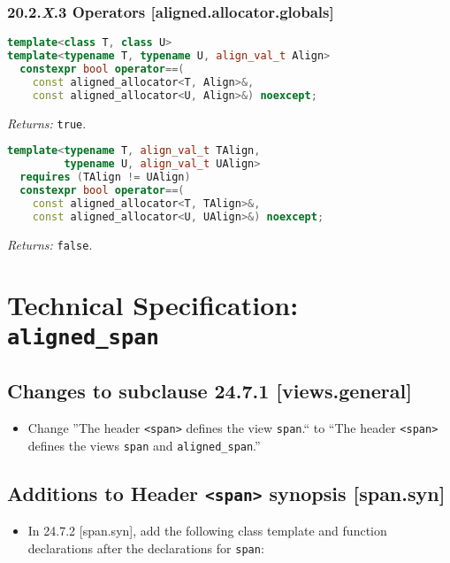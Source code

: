 \documentclass[11pt]{article}
\begin{document}
\subsubsection{20.2.\textit{X}.3	Operators	[aligned.allocator.globals]}
\begin{lstlisting}[language=C++, basicstyle=\small]
template<class T, class U>
template<typename T, typename U, align_val_t Align>
  constexpr bool operator==(
    const aligned_allocator<T, Align>&, 
    const aligned_allocator<U, Align>&) noexcept;
\end{lstlisting}
\hangindent=1cm \hspace{1cm} \textit{Returns:} \texttt{true}.

\begin{lstlisting}[language=C++, basicstyle=\small]
template<typename T, align_val_t TAlign,
         typename U, align_val_t UAlign>
  requires (TAlign != UAlign)
  constexpr bool operator==(
    const aligned_allocator<T, TAlign>&, 
    const aligned_allocator<U, UAlign>&) noexcept;
\end{lstlisting}
\hangindent=1cm \hspace{1cm} \textit{Returns:} \texttt{false}.

\section{Technical Specification: \texttt{aligned\_span}}

\subsection{Changes to subclause 24.7.1 [views.general]}

\begin{itemize}
	\item Change ''The header \texttt{<span>} defines the view \texttt{span}.`` to ``The header \texttt{<span>} defines the views \texttt{span} and \texttt{aligned_span}.''
\end{itemize}

\subsection{Additions to Header \texttt{<span>} synopsis [span.syn]}

\begin{itemize}
	\item In 24.7.2 [span.syn], add the following class template and function declarations after the declarations for \texttt{span}:
\end{itemize}
\end{document}
